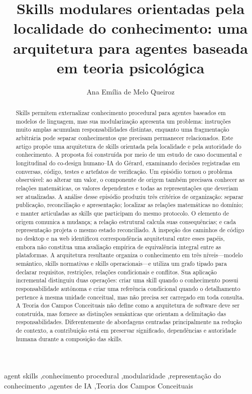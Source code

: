 \documentclass[preprint,12pt,authoryear]{elsarticle}
\newcommand{\gerard}{Gérard\xspace}
\begin{document}
\begin{frontmatter}

\title{Skills modulares orientadas pela localidade do conhecimento: uma arquitetura para agentes baseada em teoria psicológica}

\author[univasf]{Ana Emília de Melo Queiroz}
\address[univasf]{Universidade Federal do Vale do São Francisco, Brasil}

\begin{abstract}
Skills permitem externalizar conhecimento procedural para agentes baseados em modelos de linguagem, mas sua modularização apresenta um problema: instruções muito amplas acumulam responsabilidades distintas, enquanto uma fragmentação arbitrária pode separar conhecimentos que precisam permanecer relacionados. Este artigo propõe uma arquitetura de skills orientada pela localidade e pela autoridade do conhecimento. A proposta foi construída por meio de um estudo de caso documental e longitudinal do co-design humano--IA do \gerard, examinando decisões registradas em conversas, código, testes e artefatos de verificação. Um episódio tornou o problema observável: ao alterar um valor, o componente de origem também precisava conhecer as relações matemáticas, os valores dependentes e todas as representações que deveriam ser atualizadas. A análise desse episódio produziu três critérios de organização: separar publicação, reconciliação e apresentação; localizar as relações matemáticas no domínio; e manter articuladas as skills que participam do mesmo protocolo. O elemento de origem comunica a mudança; a relação estrutural calcula suas consequências; e cada representação projeta o mesmo estado reconciliado. A inspeção dos caminhos de código no desktop e na web identificou correspondência arquitetural entre esses papéis, embora não constitua uma avaliação empírica de equivalência integral entre as plataformas. A arquitetura resultante organiza o conhecimento em três níveis---modelo semântico, skills normativas e skills operacionais---e utiliza um grafo tipado para declarar requisitos, restrições, relações condicionais e conflitos. Sua aplicação incremental distinguiu duas operações: criar uma skill quando o conhecimento possui responsabilidade autônoma e criar uma referência condicional quando o detalhamento pertence à mesma unidade conceitual, mas não precisa ser carregado em toda consulta. A Teoria dos Campos Conceituais não define como a arquitetura de software deve ser construída, mas fornece as distinções semânticas que orientam a delimitação das responsabilidades. Diferentemente de abordagens centradas principalmente na redução de contexto, a contribuição está em preservar significado, dependências e autoridade humana durante a composição das skills.
\end{abstract}

\begin{keyword}
agent skills \sep conhecimento procedural \sep modularidade \sep representação do conhecimento \sep agentes de IA \sep Teoria dos Campos Conceituais
\end{keyword}

\end{frontmatter}
\end{document}
